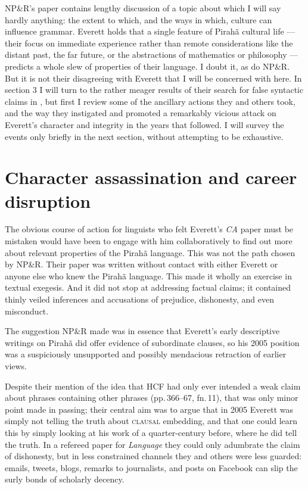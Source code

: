 \documentclass[output=paper,colorlinks,citecolor=brown
]{langscibook}
\begin{document}
NP\&R's paper \citep{NevPesRod09a} contains lengthy discussion of a
topic about which I will say hardly anything: the extent to which,
and the ways in which, culture can influence grammar. Everett holds
that a single feature of Pirah{\~a} cultural life --- their focus on
immediate experience rather than remote considerations like the distant
past, the far future, or the abstractions of mathematics or philosophy
--- predicts a whole slew of properties of their language. I doubt it,
as do NP\&R. But it is not their disagreeing with Everett that I will
be concerned with here. In section 3 I will turn to the rather meager
results of their search for false syntactic claims in \citet{Everett05},
but first I review some of the ancillary actions they and others took,
and the way they instigated and promoted a remarkably vicious attack
on Everett's character and integrity in the years that followed.
I will survey the events only briefly in the next section, without
attempting to be exhaustive.

\section{Character assassination and career disruption}\label{war}

The obvious course of action for linguists who felt Everett's
\textit{CA} paper must be mistaken would have been to engage with
him collaboratively to find out more about relevant properties of the
Pirah{\~a} language. This was not the path chosen by NP\&R. Their
paper was written without contact with either Everett or anyone else
who knew the Pirah{\~a} language. This made it wholly an exercise in
textual exegesis. And it did not stop at addressing factual claims;
it contained thinly veiled inferences and accusations of prejudice,
dishonesty, and even misconduct.

The suggestion NP\&R made was in essence that Everett's early
descriptive writings on Pirah{\~a} did offer evidence of subordinate
clauses, so his 2005 position was a suspiciously unsupported and
possibly mendacious retraction of earlier views.

Despite their mention of the idea that HCF had only ever intended a
weak claim about phrases containing other phrases (pp.\,366--67,
fn.\,11), that was only minor point made in passing; their central
aim was to argue that in 2005 Everett was simply not telling the truth
about \textsc{clausal} embedding, and that one could learn this by
simply looking at his work of a quarter-century before, where he did
tell the truth. In a refereed paper for \textit{Language} they could
only adumbrate the claim of dishonesty, but in less constrained
channels they and others were less guarded: emails, tweets, blogs,
remarks to journalists, and posts on Facebook can slip the surly bonds
of scholarly decency.
\end{document}
